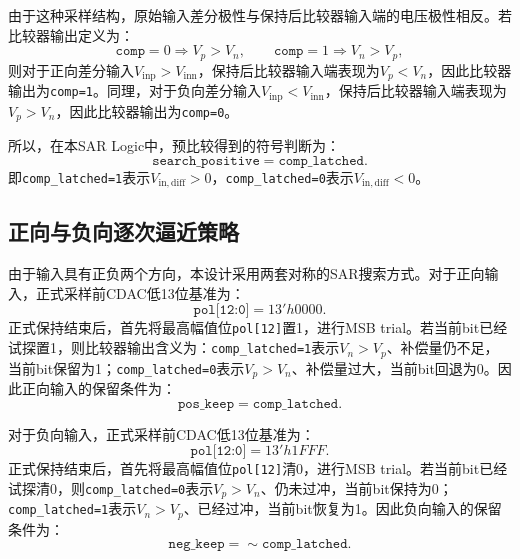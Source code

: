 由于这种采样结构，原始输入差分极性与保持后比较器输入端的电压极性相反。若比较器输出定义为：
\begin{equation}
    \texttt{comp}=0 \Rightarrow V_p > V_n,\qquad
    \texttt{comp}=1 \Rightarrow V_n > V_p,
\end{equation}
则对于正向差分输入$V_{\mathrm{inp}}>V_{\mathrm{inn}}$，保持后比较器输入端表现为$V_p<V_n$，因此比较器输出为\texttt{comp=1}。同理，对于负向差分输入$V_{\mathrm{inp}}<V_{\mathrm{inn}}$，保持后比较器输入端表现为$V_p>V_n$，因此比较器输出为\texttt{comp=0}。

所以，在本SAR Logic中，预比较得到的符号判断为：
\begin{equation}
    \texttt{search\_positive} = \texttt{comp\_latched}.
\end{equation}
即\texttt{comp\_latched=1}表示$V_{\mathrm{in,diff}}>0$，\texttt{comp\_latched=0}表示$V_{\mathrm{in,diff}}<0$。

\subsection{正向与负向逐次逼近策略}

由于输入具有正负两个方向，本设计采用两套对称的SAR搜索方式。对于正向输入，正式采样前CDAC低13位基准为：
\begin{equation}
    \texttt{pol[12:0]} = 13'h0000.
\end{equation}
正式保持结束后，首先将最高幅值位\texttt{pol[12]}置1，进行MSB trial。若当前bit已经试探置1，则比较器输出含义为：\texttt{comp\_latched=1}表示$V_n>V_p$、补偿量仍不足，当前bit保留为1；\texttt{comp\_latched=0}表示$V_p>V_n$、补偿量过大，当前bit回退为0。因此正向输入的保留条件为：
\begin{equation}
    \texttt{pos\_keep} = \texttt{comp\_latched}.
\end{equation}

对于负向输入，正式采样前CDAC低13位基准为：
\begin{equation}
    \texttt{pol[12:0]} = 13'h1FFF.
\end{equation}
正式保持结束后，首先将最高幅值位\texttt{pol[12]}清0，进行MSB trial。若当前bit已经试探清0，则\texttt{comp\_latched=0}表示$V_p>V_n$、仍未过冲，当前bit保持为0；\texttt{comp\_latched=1}表示$V_n>V_p$、已经过冲，当前bit恢复为1。因此负向输入的保留条件为：
\begin{equation}
    \texttt{neg\_keep} = \sim \texttt{comp\_latched}.
\end{equation}

